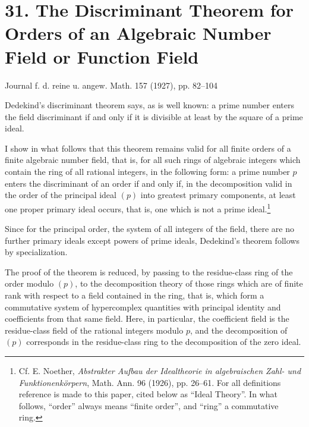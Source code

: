 \documentclass[11pt]{article}
\begin{document}
\section*{31. The Discriminant Theorem for Orders of an Algebraic Number Field or Function Field}
\begin{center}
Journal f. d. reine u. angew. Math. 157 (1927), pp. 82--104
\end{center}

Dedekind's discriminant theorem says, as is well known: a prime number enters the field discriminant if and only if it is divisible at least by the square of a prime ideal.

I show in what follows that this theorem remains valid for all finite orders of a finite algebraic number field, that is, for all such rings of algebraic integers which contain the ring of all rational integers, in the following form: a prime number $p$ enters the discriminant of an order if and only if, in the decomposition valid in the order of the principal ideal $(p)$ into greatest primary components, at least one proper primary ideal occurs, that is, one which is not a prime ideal.\footnote{Cf. E. Noether, \emph{Abstrakter Aufbau der Idealtheorie in algebraischen Zahl- und Funktionenkörpern}, Math. Ann. 96 (1926), pp. 26--61. For all definitions reference is made to this paper, cited below as ``Ideal Theory''. In what follows, ``order'' always means ``finite order'', and ``ring'' a commutative ring.}

Since for the principal order, the system of all integers of the field, there are no further primary ideals except powers of prime ideals, Dedekind's theorem follows by specialization.

The proof of the theorem is reduced, by passing to the residue-class ring of the order modulo $(p)$, to the decomposition theory of those rings which are of finite rank with respect to a field contained in the ring, that is, which form a commutative system of hypercomplex quantities with principal identity and coefficients from that same field. Here, in particular, the coefficient field is the residue-class field of the rational integers modulo $p$, and the decomposition of $(p)$ corresponds in the residue-class ring to the decomposition of the zero ideal.
\end{document}
